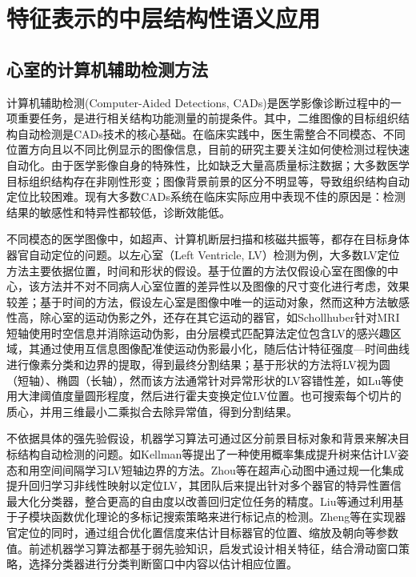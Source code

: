 \chapter{特征表示的中层结构性语义应用}
\label{chap:Detection}

\section{心室的计算机辅助检测方法}
计算机辅助检测(Computer-Aided Detections, CADs)是医学影像诊断过程中的一项重要任务，是进行相关结构功能测量的前提条件。其中，二维图像的目标组织结构自动检测是CADs技术的核心基础。在临床实践中，医生需整合不同模态、不同位置方向且以不同比例显示的图像信息，目前的研究主要关注如何使检测过程快速自动化。由于医学影像自身的特殊性，比如缺乏大量高质量标注数据；大多数医学目标组织结构存在非刚性形变；图像背景前景的区分不明显等，导致组织结构自动定位比较困难。现有大多数CADs系统在临床实际应用中表现不佳的原因是：检测结果的敏感性和特异性都较低，诊断效能低\cite{Cheng2016a}。


不同模态的医学图像中，如超声、计算机断层扫描和核磁共振等，都存在目标身体器官自动定位的问题。以左心室（Left Ventricle, LV）检测为例，大多数LV定位方法主要依据位置，时间和形状的假设。基于位置的方法仅假设心室在图像的中心，该方法并不对不同病人心室位置的差异性以及图像的尺寸变化进行考虑，效果较差；基于时间的方法，假设左心室是图像中唯一的运动对象，然而这种方法敏感性高，除心室的运动伪影之外，还存在其它运动的器官，如Schollhuber\citep{Schollhuber2008}针对MRI短轴使用时空信息并消除运动伪影，由分层模式匹配算法定位包含LV的感兴趣区域，其通过使用互信息图像配准使运动伪影最小化，随后估计特征强度—时间曲线进行像素分类和边界的提取，得到最终分割结果；基于形状的方法将LV视为圆（短轴）、椭圆（长轴），然而该方法通常针对异常形状的LV容错性差，如Lu等\citep{Lu2009}使用大津阈值度量圆形程度，然后进行霍夫变换定位LV位置。也可搜索每个切片的质心，并用三维最小二乘拟合去除异常值，得到分割结果\citep{Petitjean2011}。


不依据具体的强先验假设，机器学习算法可通过区分前景目标对象和背景来解决目标结构自动检测的问题。如Kellman等\citep{Lu2011}提出了一种使用概率集成提升树来估计LV姿态和用空间间隔学习LV短轴边界的方法。Zhou等\citep{Zhou2005}在超声心动图中通过规一化集成提升回归学习非线性映射以定位LV，其团队后来提出针对多个器官的特异性置信最大化分类器，整合更高的自由度以改善回归定位任务的精度。Liu等\citep{She2007}通过利用基于子模块函数优化理论的多标记搜索策略来进行标记点的检测。Zheng等\citep{Zheng2014}在实现器官定位的同时，通过组合优化置信度来估计目标器官的位置、缩放及朝向等参数值。前述机器学习算法都基于弱先验知识，启发式设计相关特征，结合滑动窗口策略，选择分类器进行分类判断窗口中内容以估计相应位置。


